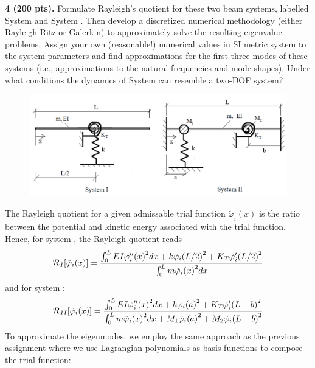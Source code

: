 \newpage
\begin{problem}
    \textbf{4 (200 pts).} Formulate Rayleigh's quotient for these two beam systems, labelled System  and System . 
    Then develop a discretized numerical methodology (either Rayleigh-Ritz or Galerkin) to approximately solve the resulting eigenvalue problems. 
    Assign your own (reasonable!) numerical values in SI metric system to the system parameters and find approximations for the first three modes of these systems (i.e., approximations to the natural frequencies and mode shapes). 
    Under what conditions the dynamics of System  can resemble a two-DOF system?
\end{problem}
\begin{figure}[!ht]
    \centering
    \includegraphics[width=\linewidth]{homework/hw4/assets/hw4_p4_setup.png}
\end{figure}
The Rayleigh quotient for a given admissable trial function $\tilde{\varphi}_i(x)$ is the ratio between the potential and kinetic energy associated with the trial function.
Hence, for system , the Rayleigh quotient reads
\begin{equation}
    \mathcal{R}_{\Rom{1}}[\tilde{\varphi}_i(x)] = \frac{ 
        \int_0^L EI {\tilde{\varphi}_i''(x)}^2 dx + k {\tilde{\varphi}_i(L/2)}^2 + K_T {\tilde{\varphi}_i'(L/2)}^2
    }{
        \int_0^L m {\tilde{\varphi}_i(x)}^2 dx 
    }
\end{equation}
and for system :
\begin{equation}
    \mathcal{R}_{\Rom{2}}[\tilde{\varphi}_i(x)] = \frac{ 
        \int_0^L EI {\tilde{\varphi}_i''(x)}^2 dx + k {\tilde{\varphi}_i(a)}^2 + K_T {\tilde{\varphi}_i'(L-b)}^2
    }{
        \int_0^L m {\tilde{\varphi}_i(x)}^2 dx + M_1 {\tilde{\varphi}_i(a)}^2 + M_2 {\tilde{\varphi}_i(L-b)}^2
    }
\end{equation}
To approximate the eigenmodes, we employ the same approach as the previous assignment where we use Lagrangian polynomials as basis functions to compose the trial function:
